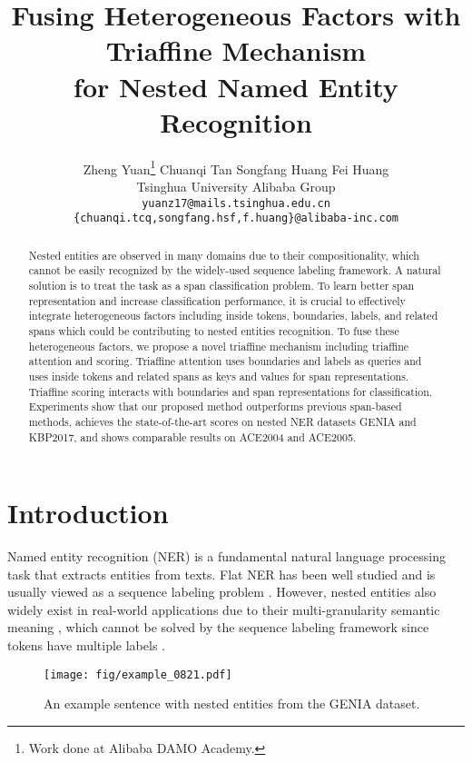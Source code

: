 \documentclass[11pt]{article}
\title{Fusing Heterogeneous Factors with Triaffine Mechanism \\ for Nested Named Entity Recognition}
\author{
Zheng Yuan\thanks{Work done at Alibaba DAMO Academy.} \space\space\space
Chuanqi Tan \space\space
Songfang Huang \space\space
Fei Huang\\
Tsinghua University \space\space\space\space
Alibaba Group\\
\texttt{yuanz17@mails.tsinghua.edu.cn}\\
\texttt{\{chuanqi.tcq,songfang.hsf,f.huang\}@alibaba-inc.com}
}
\begin{document}
\maketitle
\begin{abstract}
Nested entities are observed in many domains due to their compositionality, which cannot be easily recognized by the widely-used sequence labeling framework.
A natural solution is to treat the task as a span classification problem.
To learn better span representation and increase classification performance, it is crucial to effectively integrate heterogeneous factors including inside tokens, boundaries, labels, and related spans which could be contributing to nested entities recognition.
To fuse these heterogeneous factors, we propose a novel triaffine mechanism including triaffine attention and scoring.
Triaffine attention uses boundaries and labels as queries and uses inside tokens and related spans as keys and values for span representations.
Triaffine scoring interacts with boundaries and span representations for classification.
Experiments show that our proposed method outperforms previous span-based methods, achieves the state-of-the-art  scores on nested NER datasets GENIA and KBP2017, and shows comparable results on ACE2004 and ACE2005.
\end{abstract}

\section{Introduction}

Named entity recognition (NER) is a fundamental natural language processing task that extracts entities from texts.
Flat NER has been well studied and is usually viewed as a sequence labeling problem \cite{lample2016neural}. However, nested entities also widely exist in real-world applications due to their multi-granularity semantic meaning \cite{alex2007recognising, yuan2020unsupervised},
which cannot be solved by the sequence labeling framework since tokens have multiple labels \cite{finkel2009nested}.

\begin{figure}[t]
\centering
\texttt{[image: fig/example\_0821.pdf]}
\caption{An example sentence with nested entities from the GENIA dataset.}
\label{fig:example}
\end{figure}
\end{document}

